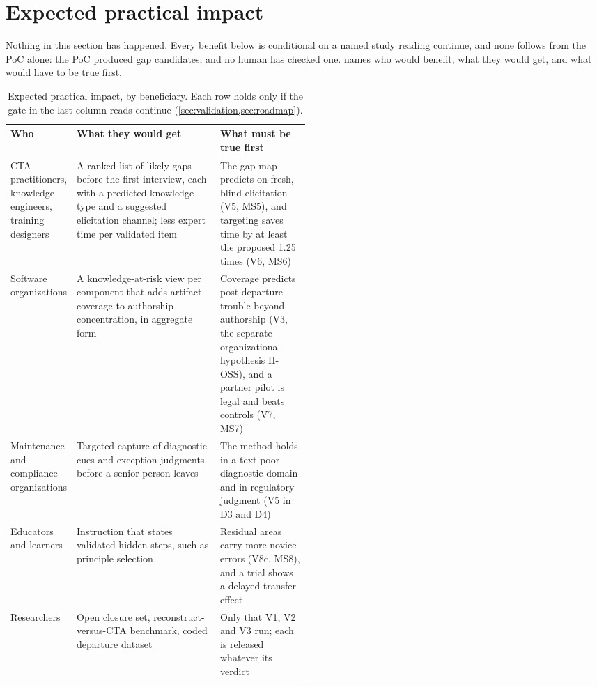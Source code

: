 \section{Expected practical impact}
\label{sec:impact}

Nothing in this section has happened. \evhyp{} Every benefit below is conditional on a named study
reading continue, and none follows from the PoC alone: the PoC produced gap candidates, and no human
has checked one.  names who would benefit, what they would get, and what would have
to be true first.

\begin{table}[!htbp]
  \centering
  \footnotesize
  \caption[Expected practical impact]{Expected practical impact, by beneficiary. Each row holds only
    if the gate in the last column reads continue (\cref{sec:validation,sec:roadmap}).}
  \label{tab:impact}
  \begin{tabularx}{\linewidth}{@{}>{\raggedright\arraybackslash}p{0.2\linewidth}
      >{\raggedright\arraybackslash}X>{\raggedright\arraybackslash}p{0.3\linewidth}@{}}
    \toprule
    Who & What they would get & What must be true first \\
    \midrule
    CTA practitioners, knowledge engineers, training designers &
      A ranked list of likely gaps before the first interview, each with a predicted knowledge type
      and a suggested elicitation channel; less expert time per validated item &
      The gap map predicts on fresh, blind elicitation (V5, MS5), and targeting saves time by at
      least the proposed 1.25 times (V6, MS6) \\
    \addlinespace
    Software organizations &
      A knowledge-at-risk view per component that adds artifact coverage to authorship
      concentration, in aggregate form &
      Coverage predicts post-departure trouble beyond authorship (V3, the separate organizational
      hypothesis H-OSS), and a partner pilot is legal and beats controls (V7, MS7) \\
    \addlinespace
    Maintenance and compliance organizations &
      Targeted capture of diagnostic cues and exception judgments before a senior person leaves &
      The method holds in a text-poor diagnostic domain and in regulatory judgment (V5 in D3 and
      D4) \\
    \addlinespace
    Educators and learners &
      Instruction that states validated hidden steps, such as principle selection &
      Residual areas carry more novice errors (V8c, MS8), and a trial shows a delayed-transfer
      effect \\
    \addlinespace
    Researchers &
      Open closure set, reconstruct-versus-CTA benchmark, coded departure dataset &
      Only that V1, V2 and V3 run; each is released whatever its verdict \\
    \bottomrule
  \end{tabularx}
\end{table}

